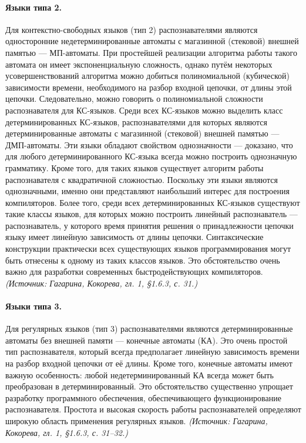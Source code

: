 \documentclass[a4paper,12pt]{article}
\begin{document}
\paragraph{Языки типа 2.}
Для контекстно-свободных языков (тип 2) распознавателями являются односторонние недетерминированные автоматы с магазинной (стековой) внешней памятью — МП-автоматы. При простейшей реализации алгоритма работы такого автомата он имеет экспоненциальную сложность, однако путём некоторых усовершенствований алгоритма можно добиться полиномиальной (кубической) зависимости времени, необходимого на разбор входной цепочки, от длины этой цепочки. Следовательно, можно говорить о полиномиальной сложности распознавателя для КС-языков. Среди всех КС-языков можно выделить класс детерминированных КС-языков, распознавателями для которых являются детерминированные автоматы с магазинной (стековой) внешней памятью — ДМП-автоматы. Эти языки обладают свойством однозначности — доказано, что для любого детерминированного КС-языка всегда можно построить однозначную грамматику. Кроме того, для таких языков существует алгоритм работы распознавателя с квадратичной сложностью. Поскольку эти языки являются однозначными, именно они представляют наибольший интерес для построения компиляторов. Более того, среди всех детерминированных КС-языков существуют такие классы языков, для которых можно построить линейный распознаватель — распознаватель, у которого время принятия решения о принадлежности цепочки языку имеет линейную зависимость от длины цепочки. Синтаксические конструкции практически всех существующих языков программирования могут быть отнесены к одному из таких классов языков. Это обстоятельство очень важно для разработки современных быстродействующих компиляторов.
\textit{(Источник: Гагарина, Кокорева, гл. 1, §1.6.3, с. 31.)}

\paragraph{Языки типа 3.}
Для регулярных языков (тип 3) распознавателями являются детерминированные автоматы без внешней памяти — конечные автоматы (КА). Это очень простой тип распознавателя, который всегда предполагает линейную зависимость времени на разбор входной цепочки от её длины. Кроме того, конечные автоматы имеют важную особенность: любой недетерминированный КА всегда может быть преобразован в детерминированный. Это обстоятельство существенно упрощает разработку программного обеспечения, обеспечивающего функционирование распознавателя. Простота и высокая скорость работы распознавателей определяют широкую область применения регулярных языков.
\textit{(Источник: Гагарина, Кокорева, гл. 1, §1.6.3, с. 31--32.)}
\end{document}
